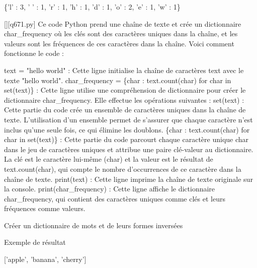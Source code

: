 \{'l' : 3, ' ' : 1, 'r' : 1, 'h' : 1, 'd' : 1, 'o' : 2, 'e' : 1, 'w' : 1\}
        \par
        \begin{solution}
            \renewcommand{\nomfichier}{q671.py}
            \pythonfile{\chemincode \nomfichier}[][\nomfichier]
            Ce code Python prend une chaîne de texte et crée un dictionnaire char\_frequency où les clés sont des caractères uniques dans la chaîne, et les valeurs sont les fréquences de ces caractères dans la chaîne. Voici comment fonctionne le code :

    text = "hello world" : Cette ligne initialise la chaîne de caractères text avec le texte "hello world".
    char\_frequency = \{char : text.count(char) for char in set(text)\} : Cette ligne utilise une compréhension de dictionnaire pour créer le dictionnaire char\_frequency. Elle effectue les opérations suivantes :
        set(text) : Cette partie du code crée un ensemble de caractères uniques dans la chaîne de texte. L'utilisation d'un ensemble permet de s'assurer que chaque caractère n'est inclus qu'une seule fois, ce qui élimine les doublons.
        \{char : text.count(char) for char in set(text)\} : Cette partie du code parcourt chaque caractère unique char dans le jeu de caractères uniques et attribue une paire clé-valeur au dictionnaire. La clé est le caractère lui-même (char) et la valeur est le résultat de text.count(char), qui compte le nombre d'occurrences de ce caractère dans la chaîne de texte.
    print(text) : Cette ligne imprime la chaîne de texte originale sur la console.
    print(char\_frequency) : Cette ligne affiche le dictionnaire char\_frequency, qui contient des caractères uniques comme clés et leurs fréquences comme valeurs.
        \end{solution}
        

        \question
        Créer un dictionnaire de mots et de leurs formes inversées

Exemple de résultat

['apple', 'banana', 'cherry']

